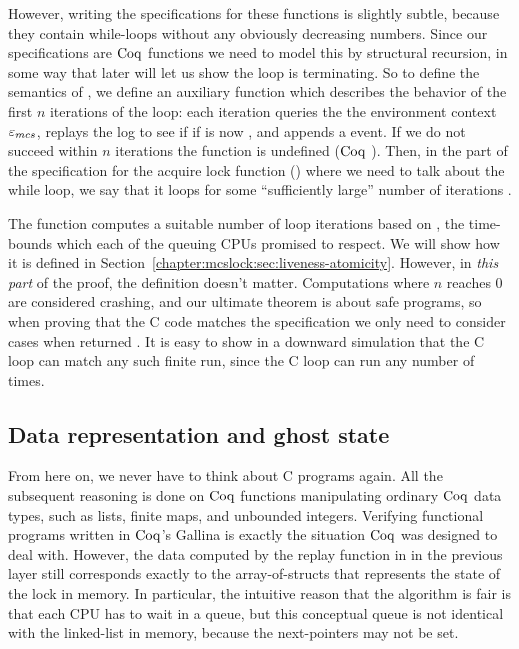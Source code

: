 However, writing the specifications for these functions is slightly subtle, 
because they contain
while-loops without any obviously decreasing numbers. Since our
specifications are $\mathrm{Coq}$ functions we need to model this by structural
recursion, in some way that later will let us show the loop is terminating.
So to define the semantics of ,
we define an auxiliary function
 which describes the
behavior of the first $n$ iterations of the loop: each iteration
queries the the environment context ${\varepsilon}_{mcs}$, replays the log to see if if  is now , and appends a  event.
If we do not succeed within $n$ iterations the function is undefined ($\mathrm{Coq}$ ).
Then, in the part of the  specification for the  acquire lock 
function () where we need to talk about the while loop,
we say that it loops for some ``sufficiently large'' 
number of iterations . 

The function  computes a suitable 
number of loop iterations based on , the time-bounds  which each of the queuing CPUs promised to respect.
We will show how it is defined in Section~\ref{chapter:mcslock:sec:liveness-atomicity}. 
However, in \emph{this part} of the proof, the definition doesn't matter. 
Computations where $n$ reaches 0 are considered crashing, and our
ultimate theorem is about safe programs, so when proving that the C
code matches the specification we only need to 
consider cases when  returned .
It is easy to show in a downward simulation that the C loop can match any such finite run, 
since the C loop can run any number of times.

\subsection{Data representation and ghost state}
\label{chapter:mcslock:sec:representation-ghost}

From here on, we never have to think about C programs again.  All the
subsequent reasoning is done on $\mathrm{Coq}$ functions manipulating ordinary
$\mathrm{Coq}$ data types, such as lists, finite maps, and unbounded integers.
Verifying functional programs written in $\mathrm{Coq}$'s Gallina is exactly the
situation $\mathrm{Coq}$ was designed to deal with. However, the data computed
by the replay function in in the previous layer still corresponds
exactly to the array-of-structs that represents the state of the lock
in memory.
In particular, the intuitive reason that the algorithm is fair is that
each CPU has to wait in a queue, but this conceptual queue is not identical with
the linked-list in memory, because the next-pointers may not be set.

